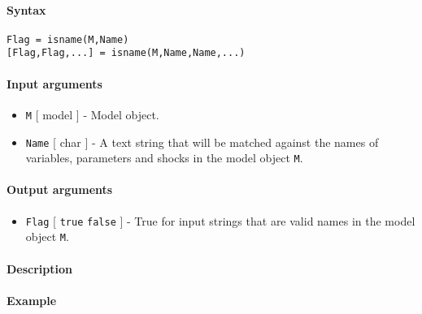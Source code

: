 


	\paragraph{Syntax}

\begin{verbatim}
Flag = isname(M,Name)
[Flag,Flag,...] = isname(M,Name,Name,...)
\end{verbatim}

\paragraph{Input arguments}

\begin{itemize}
\item
  \texttt{M} {[} model {]} - Model object.
\item
  \texttt{Name} {[} char {]} - A text string that will be matched
  against the names of variables, parameters and shocks in the model
  object \texttt{M}.
\end{itemize}

\paragraph{Output arguments}

\begin{itemize}
\itemsep1pt\parskip0pt
\item
  \texttt{Flag} {[} \texttt{true} \textbar{} \texttt{false} {]} - True
  for input strings that are valid names in the model object \texttt{M}.
\end{itemize}

\paragraph{Description}

\paragraph{Example}


